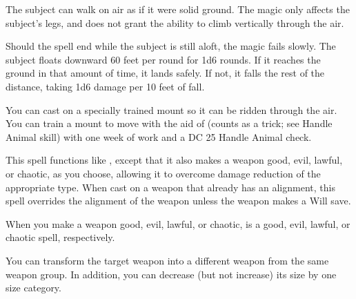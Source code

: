 \spellrng{\rngtouch}
\spelldur{\durshort}
\begin{spelleffect}
  The subject can walk on air as if it were solid ground. The magic only affects the subject's legs, and does not grant the ability to climb vertically through the air.
  \par Should the spell end while the subject is still aloft, the magic fails slowly. The subject floats downward 60 feet per round for 1d6 rounds. If it reaches the ground in that amount of time, it lands safely. If not, it falls the rest of the distance, taking 1d6 damage per 10 feet of fall.
\end{spelleffect}
\begin{spellnotes}
  \par You can cast  on a specially trained mount so it can be ridden through the air. You can train a mount to move with the aid of  (counts as a trick; see Handle Animal skill) with one week of work and a DC 25 Handle Animal check.
\end{spellnotes}

\begin{spelleffect}
  This spell functions like , except that it also makes a weapon good, evil, lawful, or chaotic, as you choose, allowing it to overcome damage reduction of the appropriate type. When cast on a weapon that already has an alignment, this spell overrides the alignment of the weapon unless the weapon makes a Will save.
\end{spelleffect}
\begin{spellnotes}
  When you make a weapon good, evil, lawful, or chaotic,  is a good, evil, lawful, or chaotic spell, respectively.
\end{spellnotes}

\spelldur{\durmed}
\begin{spelleffect}
    You can transform the target weapon into a different weapon from the same weapon group. In addition, you can decrease (but not increase) its size by one size category.
\end{spelleffect}

